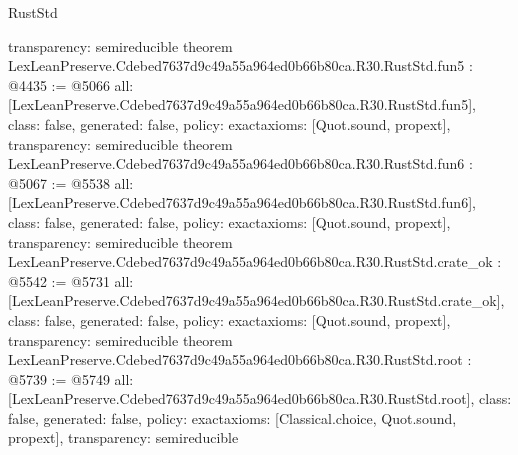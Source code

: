 \begin{lexlean}{RustStd}
\begin{coremodule}
{  transparency: semireducible
}
theorem LexLeanPreserve.Cdebed7637d9c49a55a964ed0b66b80ca.R30.RustStd.fun5 : @4435 := @5066 {
  all: [LexLeanPreserve.Cdebed7637d9c49a55a964ed0b66b80ca.R30.RustStd.fun5],
  class: false,
  generated: false,
  policy: exact{axioms: [Quot.sound, propext]},
  transparency: semireducible
}
theorem LexLeanPreserve.Cdebed7637d9c49a55a964ed0b66b80ca.R30.RustStd.fun6 : @5067 := @5538 {
  all: [LexLeanPreserve.Cdebed7637d9c49a55a964ed0b66b80ca.R30.RustStd.fun6],
  class: false,
  generated: false,
  policy: exact{axioms: [Quot.sound, propext]},
  transparency: semireducible
}
theorem LexLeanPreserve.Cdebed7637d9c49a55a964ed0b66b80ca.R30.RustStd.crate_ok : @5542 := @5731 {
  all: [LexLeanPreserve.Cdebed7637d9c49a55a964ed0b66b80ca.R30.RustStd.crate_ok],
  class: false,
  generated: false,
  policy: exact{axioms: [Quot.sound, propext]},
  transparency: semireducible
}
theorem LexLeanPreserve.Cdebed7637d9c49a55a964ed0b66b80ca.R30.RustStd.root : @5739 := @5749 {
  all: [LexLeanPreserve.Cdebed7637d9c49a55a964ed0b66b80ca.R30.RustStd.root],
  class: false,
  generated: false,
  policy: exact{axioms: [Classical.choice, Quot.sound, propext]},
  transparency: semireducible
}


\end{coremodule}
\end{lexlean}
